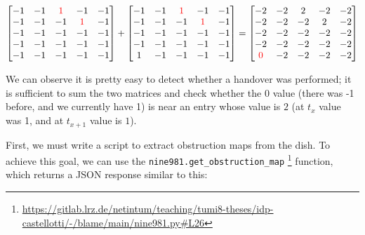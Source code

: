 \documentclass[IN,11pt,twoside,openright,idp,english]{tumthesis}
\begin{document}
$\begin{bmatrix}
-1 & -1 & \color{red}1 &           -1 & -1 \\
-1 & -1 &           -1 & \color{red}1 & -1 \\
-1 & -1 &           -1 &           -1 & -1 \\
-1 & -1 &           -1 &           -1 & -1 \\
-1 & -1 &           -1 &           -1 & -1 \\
\end{bmatrix}
+
\begin{bmatrix}
-1 & -1 & \color{red}1 &           -1 & -1 \\
-1 & -1 &           -1 & \color{red}1 & -1 \\
-1 & -1 &           -1 &           -1 & -1 \\
-1 & -1 &           -1 &           -1 & -1 \\
1 & -1 &            -1 &           -1 & -1 \\
\end{bmatrix}
=
\begin{bmatrix}
          -2 & -2 & 2 & -2 & -2 \\
          -2 & -2 & -2 & 2 & -2 \\
          -2 & -2 & -2 & -2 & -2 \\
          -2 & -2 & -2 & -2 & -2 \\
\color{red}0 & -2 & -2 & -2 & -2 \\
\end{bmatrix}$

\vspace{10mm}

We can observe it is pretty easy to detect whether a handover was performed; it is sufficient to sum the two matrices
and check whether the $ 0 $ value (there was -1 before, and we currently have 1) is near an entry whose value is $ 2 $
(at $ t_{x} $ value was 1, and at $ t_{x+1} $ value is $ 1 $). 

First, we must write a script to extract obstruction maps from the dish. To achieve this goal, we can use the
\texttt{nine981.get\_obstruction\_map}
\footnote{\url{https://gitlab.lrz.de/netintum/teaching/tumi8-theses/idp-castellotti/-/blame/main/nine981.py\#L26}}
function, which returns a JSON response similar to this:
\end{document}
